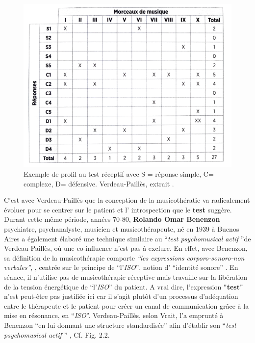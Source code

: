 \begin{center}
	\begin{figure}
		\includegraphics[width=0.9\linewidth]{images/graphiques/verdeaupailles.png}	
		\caption[Profil test réceptif Verdeau-Paillès]{Exemple de profil au test réceptif avec S = réponse 
		simple, C= complexe, D= défensive. 
		Verdeau-Paillès, extrait \autocite[p.89] {lecourt_les_2017}.}
	\end{figure}	
\end{center}
C'est avec Verdeau-Paillès que la conception de la musicothératie va radicalement évoluer pour se 
centrer sur le patient et l' introspection que le \textbf{test} suggère.
Durant cette même période, années 70-80,
\textbf{ Rolando Omar Benenzon} psychiatre, psychanalyste,
musicien et musicothérapeute, né en 1939 à Buenos Aires a également élaboré une technique similaire au \enquote {\textit{test psychomusical actif} }de Verdeau-Paillès,
 où une co-influence n'est pas à exclure.
 En effet, avec Benenzon, sa définition de la musicothérapie comporte
\emph{\textsl{ ``les expressions corporo-sonoro-non
     verbales''}}, \autocite{benenzon:musicotherapie},
centrée sur le principe de \enquote{l'\textit{ISO}}, notion
 d' \enquote{identité sonore} \autocite{benenzon:musicotherapie}.
En séance, il n'utilise pas de
 musicothérapie réceptive mais travaille sur la libération de
 la tension énergétique de \enquote{l'\textit{ISO}} du patient.
A vrai dire, l'expression \textbf{"test"} n'est peut-être pas justifiée ici car il s'agit plutôt d'un processus 
d'adéquation entre le thérapeute et le patient pour créer un canal de communication grâce à la mise en 
résonance, en \enquote{\textit{ISO}}. Verdeau-Paillès, selon Vrait, l'a emprunté à Benenzon  \enquote {en 
lui donnant une structure standardisée} afin d'établir son \enquote {\textit{test psychomusical actif} } 
\autocite[p. 39]{vrait_musicotherapie_2018}, Cf.  Fig. 2.2.


